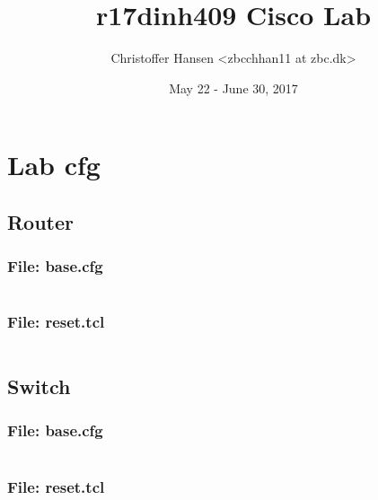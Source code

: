 \documentclass{article}
\begin{document}
\title{r17dinh409 Cisco Lab}
\author{Christoffer Hansen <zbcchhan11 at zbc.dk>}
\date{May 22 - June 30, 2017}
\maketitle

\newpage
\tableofcontents


%
%
\section{Lab cfg}


\subsection{Router}
\subsubsection{File: base.cfg}
\inputminted[frame=lines,framesep=2mm,baselinestretch=1.2,bgcolor=lightgray,fontsize=\footnotesize,linenos,breaklines=true]{powershell}{code/router/base.cfg}
\subsubsection{File: reset.tcl}
\inputminted[frame=lines,framesep=2mm,baselinestretch=1.2,bgcolor=lightgray,fontsize=\footnotesize,linenos,breaklines=true]{powershell}{code/router/reset.tcl}


\subsection{Switch}
\subsubsection{File: base.cfg}
\inputminted[frame=lines,framesep=2mm,baselinestretch=1.2,bgcolor=lightgray,fontsize=\footnotesize,linenos,breaklines=true]{powershell}{code/switch/base.cfg}
\subsubsection{File: reset.tcl}
\inputminted[frame=lines,framesep=2mm,baselinestretch=1.2,bgcolor=lightgray,fontsize=\footnotesize,linenos,breaklines=true]{powershell}{code/switch/reset.tcl}

%
%




%
%
\end{document}
